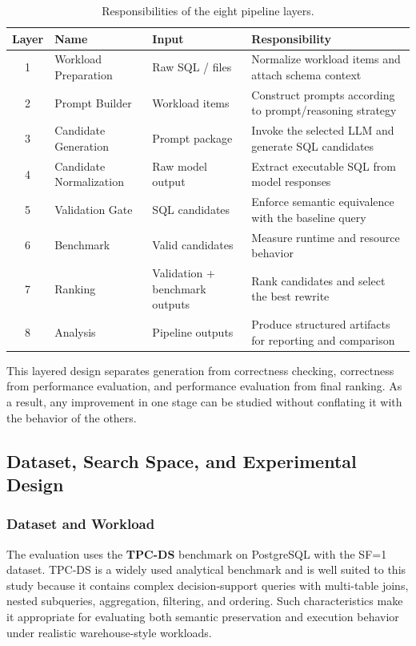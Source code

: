 \begin{table}[htbp]
\centering
\caption{Responsibilities of the eight pipeline layers.}
\label{tab:method-pipeline}
\begin{tabular}{|c|l|l|l|}
\textbf{Layer} & \textbf{Name} & \textbf{Input} & \textbf{Responsibility} \\
\hline
1 & Workload Preparation & Raw SQL / files & Normalize workload items and attach schema context \\
2 & Prompt Builder & Workload items & Construct prompts according to prompt/reasoning strategy \\
3 & Candidate Generation & Prompt package & Invoke the selected LLM and generate SQL candidates \\
4 & Candidate Normalization & Raw model output & Extract executable SQL from model responses \\
5 & Validation Gate & SQL candidates & Enforce semantic equivalence with the baseline query \\
6 & Benchmark & Valid candidates & Measure runtime and resource behavior \\
7 & Ranking & Validation + benchmark outputs & Rank candidates and select the best rewrite \\
8 & Analysis & Pipeline outputs & Produce structured artifacts for reporting and comparison \\
\hline
\end{tabular}
\end{table}

This layered design separates generation from correctness checking, correctness from performance evaluation, and performance evaluation from final ranking. As a result, any improvement in one stage can be studied without conflating it with the behavior of the others.

\subsection{Dataset, Search Space, and Experimental Design}

\subsubsection{Dataset and Workload}

The evaluation uses the \textbf{TPC-DS} benchmark on PostgreSQL with the SF=1 dataset. TPC-DS is a widely used analytical benchmark and is well suited to this study because it contains complex decision-support queries with multi-table joins, nested subqueries, aggregation, filtering, and ordering. Such characteristics make it appropriate for evaluating both semantic preservation and execution behavior under realistic warehouse-style workloads.

